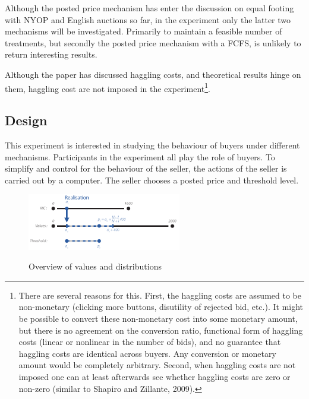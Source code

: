 \documentclass[a4paper,12pt]{article}
\begin{document}
Although the posted price mechanism has enter the discussion on equal footing with NYOP and English auctions so far, in the experiment only the latter two mechanisms will be investigated. Primarily to maintain a feasible number of treatments, but secondly the posted price mechanism with a FCFS, is unlikely to return interesting results. 

Although the paper has discussed haggling costs, and theoretical results hinge on them, haggling cost are not imposed in the experiment\footnote{There are several reasons for this. First, the haggling costs are assumed to be non-monetary (clicking more buttons, disutility of rejected bid, etc.). It might be possible to convert these non-monetary cost into some monetary amount, but there is no agreement on the conversion ratio, functional form of haggling costs (linear or nonlinear in the number of bids), and no guarantee that haggling costs are identical across buyers. Any conversion or monetary amount would be completely arbitrary. Second, when haggling costs are not imposed one can at least afterwards see whether haggling costs are zero or non-zero (similar to Shapiro and Zillante, 2009).}.%

	\subsection{Design}
	\label{sec:design}

	This experiment is interested in studying the behaviour of buyers under different mechanisms. Participants in the experiment all play the role of buyers. To simplify and control for the behaviour of the seller, the actions of the seller is carried out by a computer. The seller chooses a posted price and threshold level.

	\begin{figure}
	        \centering
	        \caption{Overview of values and distributions}
	        \includegraphics[width=0.6\textwidth]{Figures/Distribution}
			\label{fig:distribution}
	\end{figure}
\end{document}
